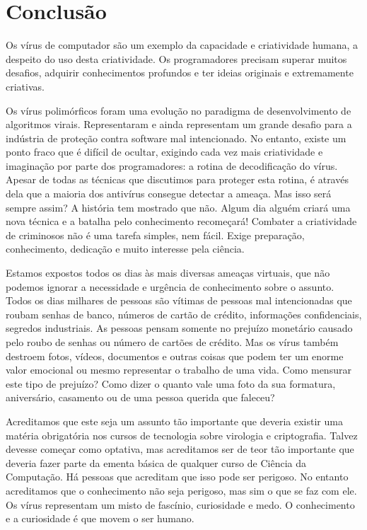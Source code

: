 \chapter{Conclusão}

Os vírus de computador são um exemplo da capacidade e criatividade humana, a despeito do uso desta criatividade. Os programadores precisam superar muitos desafios, adquirir conhecimentos profundos e ter ideias originais e extremamente criativas.

Os vírus polimórficos foram uma evolução no paradigma de desenvolvimento de algoritmos virais. Representaram e ainda representam um grande desafio para a indústria de proteção contra software mal intencionado. No entanto, existe um ponto fraco que é difícil de ocultar, exigindo cada vez mais criatividade e imaginação por parte dos programadores: a rotina de decodificação do vírus. Apesar de todas as técnicas que discutimos para proteger esta rotina, é através dela que a maioria dos antivírus consegue detectar a ameaça. Mas isso será sempre assim? A história tem mostrado que não. Algum dia alguém criará uma nova técnica e a batalha pelo conhecimento recomeçará! Combater a criatividade de criminosos não é uma tarefa simples, nem fácil. Exige preparação, conhecimento, dedicação e muito interesse pela ciência.

Estamos expostos todos os dias às mais diversas ameaças virtuais, que não podemos ignorar a necessidade e urgência de conhecimento sobre o assunto. Todos os dias milhares de pessoas são vítimas de pessoas mal intencionadas que roubam senhas de banco, números de cartão de crédito, informações confidenciais, segredos industriais. As pessoas pensam somente no prejuízo monetário causado pelo roubo de senhas ou número de cartões de crédito. Mas os vírus também destroem fotos, vídeos, documentos e outras coisas que podem ter um enorme valor emocional ou mesmo representar o trabalho de uma vida. Como mensurar este tipo de prejuízo? Como dizer o quanto vale uma foto da sua formatura, aniversário, casamento ou de uma pessoa querida que faleceu?

Acreditamos que este seja um assunto tão importante que deveria existir uma matéria obrigatória nos cursos de tecnologia sobre virologia e criptografia. Talvez devesse começar como optativa, mas acreditamos ser de teor tão importante que deveria fazer parte da ementa básica de qualquer curso de Ciência da Computação. Há pessoas que acreditam que isso pode ser perigoso. No entanto acreditamos que o conhecimento não seja perigoso, mas sim o que se faz com ele. Os vírus representam um misto de fascínio, curiosidade e medo. O conhecimento e a curiosidade é que movem o ser humano.

